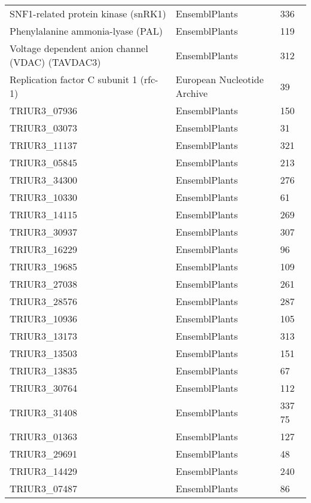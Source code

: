 \begingroup
\footnotesize{
\begin{longtable}{|p{5cm}|p{5cm}|p{5cm}|}
\hline
\centering{\bf{Gène}} &\centering{\bf{Référence}} &\centering{\bf{Contigs}} \\ 
\endhead\hline
SNF1-related protein kinase (snRK1) & EnsemblPlants & 336 \\
\hline
Phenylalanine ammonia-lyase (PAL) & EnsemblPlants & 119 \\
\hline
Voltage dependent anion channel (VDAC) (TAVDAC3) & EnsemblPlants & 312 \\
\hline
Replication factor C subunit 1 (rfc-1) & European Nucleotide Archive & 39 \\
\hline
TRIUR3\_07936 & EnsemblPlants  & 150 \\
\hline
TRIUR3\_03073 & EnsemblPlants  & 31 \\
\hline
TRIUR3\_11137 & EnsemblPlants  & 321 \\
\hline
TRIUR3\_05845 & EnsemblPlants  & 213 \\
\hline
TRIUR3\_34300 & EnsemblPlants  & 276 \\
\hline
TRIUR3\_10330 & EnsemblPlants  & 61 \\
\hline
TRIUR3\_14115 & EnsemblPlants  & 269 \\
\hline
TRIUR3\_30937 & EnsemblPlants  & 307 \\
\hline
TRIUR3\_16229 & EnsemblPlants  & 96 \\
\hline
TRIUR3\_19685 & EnsemblPlants  & 109 \\
\hline
TRIUR3\_27038 & EnsemblPlants  & 261 \\
\hline
TRIUR3\_28576 & EnsemblPlants  & 287 \\
\hline
TRIUR3\_10936 & EnsemblPlants  & 105 \\
\hline
TRIUR3\_13173 & EnsemblPlants  & 313 \\
\hline
TRIUR3\_13503 & EnsemblPlants  & 151 \\
\hline
TRIUR3\_13835 & EnsemblPlants  & 67 \\
\hline
TRIUR3\_30764 & EnsemblPlants  & 112 \\
\hline
TRIUR3\_31408 & EnsemblPlants  & 337 75 \\
\hline
TRIUR3\_01363 & EnsemblPlants  & 127 \\
\hline
TRIUR3\_29691 & EnsemblPlants  & 48 \\
\hline
TRIUR3\_14429 & EnsemblPlants  & 240 \\
\hline
TRIUR3\_07487 & EnsemblPlants  & 86 \\

\end{longtable}}
